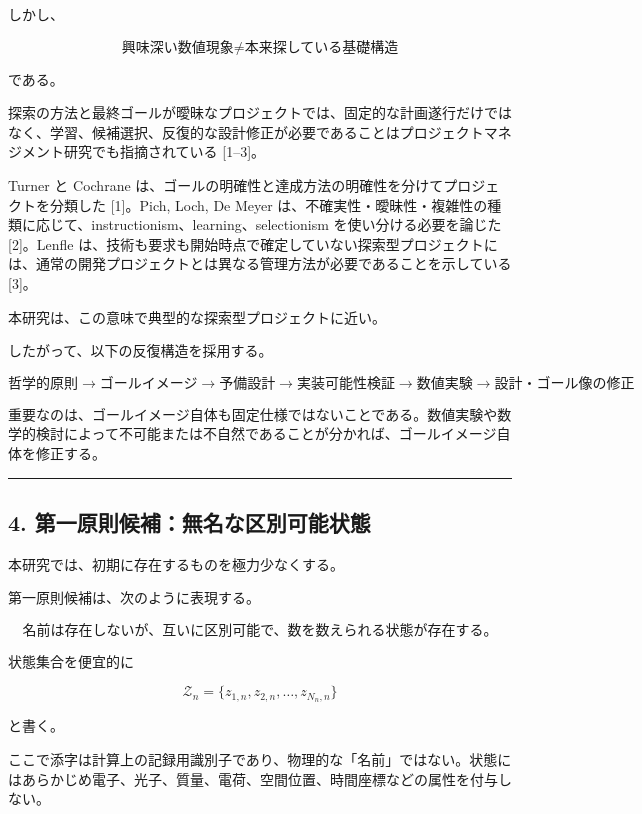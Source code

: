 \documentclass[
  a4paper,
]{ltjsarticle}
\begin{document}
しかし、

\[
\boxed{
\text{興味深い数値現象}
\neq
\text{本来探している基礎構造}
}
\]

である。

探索の方法と最終ゴールが曖昧なプロジェクトでは、固定的な計画遂行だけではなく、学習、候補選択、反復的な設計修正が必要であることはプロジェクトマネジメント研究でも指摘されている
{[}1--3{]}。

Turner と Cochrane
は、ゴールの明確性と達成方法の明確性を分けてプロジェクトを分類した
{[}1{]}。Pich, Loch, De Meyer
は、不確実性・曖昧性・複雑性の種類に応じて、instructionism、learning、selectionism
を使い分ける必要を論じた {[}2{]}。Lenfle
は、技術も要求も開始時点で確定していない探索型プロジェクトには、通常の開発プロジェクトとは異なる管理方法が必要であることを示している
{[}3{]}。

本研究は、この意味で典型的な探索型プロジェクトに近い。

したがって、以下の反復構造を採用する。

\[
\boxed{
\text{哲学的原則}
\rightarrow
\text{ゴールイメージ}
\rightarrow
\text{予備設計}
\rightarrow
\text{実装可能性検証}
\rightarrow
\text{数値実験}
\rightarrow
\text{設計・ゴール像の修正}
}
\]

重要なのは、ゴールイメージ自体も固定仕様ではないことである。数値実験や数学的検討によって不可能または不自然であることが分かれば、ゴールイメージ自体を修正する。

\begin{center}\rule{0.5\linewidth}{0.5pt}\end{center}

\subsection{4.
第一原則候補：無名な区別可能状態}\label{ux7b2cux4e00ux539fux5247ux5019ux88dcux7121ux540dux306aux533aux5225ux53efux80fdux72b6ux614b}

本研究では、初期に存在するものを極力少なくする。

第一原則候補は、次のように表現する。

\[
\boxed{
\text{名前は存在しないが、互いに区別可能で、数を数えられる状態が存在する。}
}
\]

状態集合を便宜的に

\[
\mathcal Z_n=\{z_{1,n},z_{2,n},\ldots,z_{N_n,n}\}
\]

と書く。

ここで添字は計算上の記録用識別子であり、物理的な「名前」ではない。状態にはあらかじめ電子、光子、質量、電荷、空間位置、時間座標などの属性を付与しない。
\end{document}
